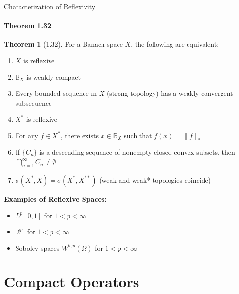 \documentclass[aspectratio=169,10pt]{beamer}
\theoremstyle{definition}
\newtheorem{thm}{Theorem}
\begin{document}
\begin{frame}{Characterization of Reflexivity}
\framesubtitle{Theorem 1.32}

\begin{thm}[1.32]
For a Banach space $X$, the following are equivalent:
\begin{enumerate}
    \item[(a)] $X$ is reflexive
    \item[(b)] $\mathbb{B}_X$ is weakly compact
    \item[(c)] Every bounded sequence in $X$ (strong topology) has a weakly convergent subsequence
    \item[(d)] $X^*$ is reflexive
    \item[(e)] For any $f \in X^*$, there exists $x \in \mathbb{B}_X$ such that $f(x) = \|f\|_*$
    \item[(f)] If $\{C_n\}$ is a descending sequence of nonempty closed convex subsets, then $\bigcap_{n=1}^{\infty} C_n \neq \emptyset$
    \item[(g)] $\sigma(X^*, X) = \sigma(X^*, X^{**})$ (weak and weak* topologies coincide)
\end{enumerate}
\end{thm}

\textbf{Examples of Reflexive Spaces:}
\begin{itemize}
    \item $L^p[0,1]$ for $1 < p < \infty$
    \item $\ell^p$ for $1 < p < \infty$
    \item Sobolev spaces $W^{k,p}(\Omega)$ for $1 < p < \infty$
\end{itemize}
\end{frame}

\section{Compact Operators}
\end{document}
